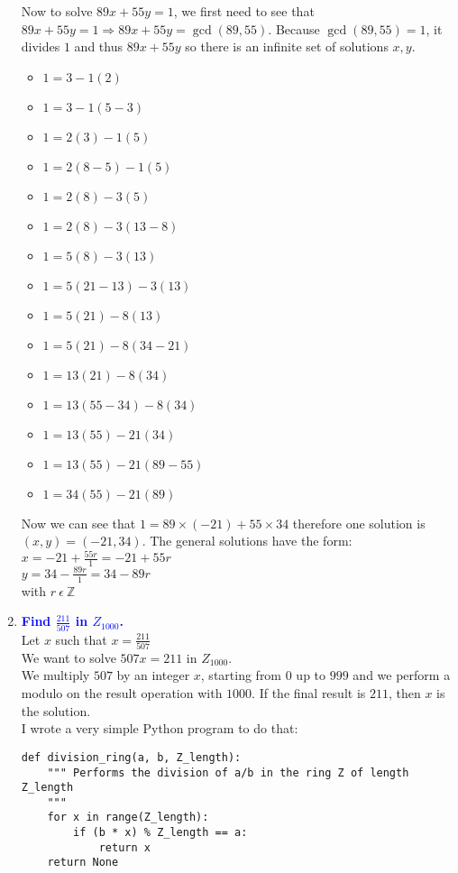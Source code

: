 \documentclass[11pt]{article}
\begin{document}
\begin{enumerate}
\begin{enumerate}
    \end{enumerate}
    Now to solve $89x+55y=1$, we first need to see that $89x+55y=1 \Rightarrow 89x+55y=\gcd(89, 55)$.
    Because $\gcd(89, 55) = 1$, it divides $1$ and thus $89x + 55y$ so there is an infinite set of solutions $x, y$.
    \begin{itemize}
        \item $1 = 3 - 1(2)$
        \item $1 = 3 - 1(5-3)$
        \item $1 = 2(3) - 1(5)$
        \item $1 = 2(8-5) - 1(5)$
        \item $1 = 2(8) - 3(5)$
        \item $1 = 2(8) - 3(13-8)$
        \item $1 = 5(8) - 3(13)$
        \item $1 = 5(21-13) - 3(13)$
        \item $1 = 5(21) - 8(13)$
        \item $1 = 5(21) - 8(34-21)$
        \item $1 = 13(21) - 8(34)$
        \item $1 = 13(55-34) - 8(34)$
        \item $1 = 13(55) - 21(34)$
        \item $1 = 13(55) - 21(89-55)$
        \item $1 = 34(55) - 21(89)$
    \end{itemize}
     Now we can see that $1 = 89 \times (-21) + 55 \times 34 $ therefore one solution is $(x, y) = (-21, 34)$.
     The general solutions have the form:
     \\ $x = -21 + \frac{55r}{1} = -21 + 55r$
     \\ $y = 34 - \frac{89r}{1} = 34 - 89r$
     \\ with $r\ \epsilon\ \mathbb{Z}$


\item \textbf{\textcolor{blue}{Find $\frac{211}{507}$ in $Z_{1000}$.}}
    \\ Let $x$ such that $x = \frac{211}{507}$
    \\ We want to solve $507x = 211$ in $Z_1000$.
    \\ We multiply $507$ by an integer $x$,  starting from $0$ up to $999$ and we perform a modulo on the result operation with $1000$. If the final result is $211$, then $x$ is the solution.
    \\ I wrote a very simple Python program to do that:
    \begin{verbatim}
def division_ring(a, b, Z_length):
    """ Performs the division of a/b in the ring Z of length Z_length    
    """
    for x in range(Z_length):
        if (b * x) % Z_length == a:
            return x
    return None


\end{verbatim}
\end{enumerate}
\end{document}
